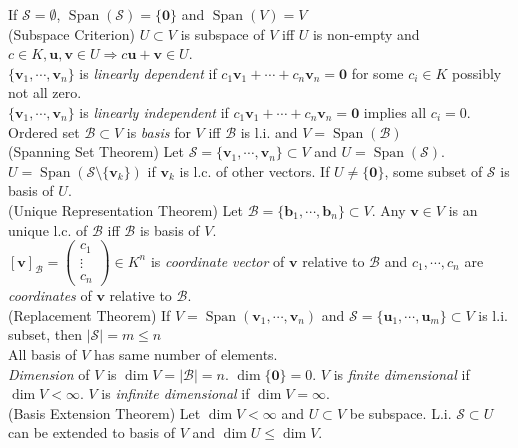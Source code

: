 \documentclass{article}
\theoremstyle{definition}
\DeclareMathOperator{\Span}{Span}
\begin{document}
If $\mathcal{S}=\emptyset$, $\Span(\mathcal{S})=\{\mathbf{0}\}$ and $\Span(V)=V$\\
(Subspace Criterion) $U\subset V$ is subspace of $V$ iff $U$ is non-empty and $c\in K,\mathbf{u},\mathbf{v}\in U\Rightarrow c\mathbf{u}+\mathbf{v}\in U$.\\
$\{\mathbf{v}_{1},\cdots,\mathbf{v}_{n}\}$ is \textit{linearly dependent} if $c_{1}\mathbf{v}_{1}+\cdots+c_{n}\mathbf{v}_{n}=\mathbf{0}$ for some $c_{i}\in K$ possibly not all zero.\\
$\{\mathbf{v}_{1},\cdots,\mathbf{v}_{n}\}$ is \textit{linearly independent} if $c_{1}\mathbf{v}_{1}+\cdots+c_{n}\mathbf{v}_{n}=\mathbf{0}$ implies all $c_{i}=0$.\\
Ordered set $\mathcal{B}\subset V$ is \textit{basis} for $V$ iff $\mathcal{B}$ is l.i. and $V=\Span(\mathcal{B})$\\
(Spanning Set Theorem) Let $\mathcal{S}=\{\mathbf{v}_{1},\cdots,\mathbf{v}_{n}\}\subset V$ and $U=\Span(\mathcal{S})$.\\
$U=\Span(\mathcal{S}\setminus\{\mathbf{v}_{k}\})$ if $\mathbf{v}_{k}$ is l.c. of other vectors. If $U\neq\{\mathbf{0}\}$, some subset of $\mathcal{S}$ is basis of $U$.\\
(Unique Representation Theorem) Let $\mathcal{B}=\{\mathbf{b}_{1},\cdots,\mathbf{b}_{n}\}\subset V$. Any $\mathbf{v}\in V$ is an unique l.c. of $\mathcal{B}$ iff $\mathcal{B}$ is basis of $V$.\\
$\left[\mathbf{v}\right]_{\mathcal{B}}=\begin{pmatrix}
    c_{1}\\
    \vdots\\
    c_{n}
\end{pmatrix}\in K^{n}$ is \textit{coordinate vector} of $\mathbf{v}$ relative to $\mathcal{B}$ and $c_{1},\cdots,c_{n}$ are \textit{coordinates} of $\mathbf{v}$ relative to $\mathcal{B}$.\\
(Replacement Theorem) If $V=\Span(\mathbf{v}_{1},\cdots,\mathbf{v}_{n})$ and $\mathcal{S}=\{\mathbf{u}_{1},\cdots,\mathbf{u}_{m}\}\subset V$ is l.i. subset, then $\left|\mathcal{S}\right|=m\leq n$\\
All basis of $V$ has same number of elements.\\
\textit{Dimension} of $V$ is $\dim{V}=\left|\mathcal{B}\right|=n$. $\dim\{\mathbf{0}\}=0$. $V$ is \textit{finite dimensional} if $\dim{V}<\infty$. $V$ is \textit{infinite dimensional} if $\dim{V}=\infty$.\\
(Basis Extension Theorem) Let $\dim{V}<\infty$ and $U\subset V$ be subspace. L.i. $\mathcal{S}\subset U$ can be extended to basis of $V$ and $\dim{U}\leq\dim{V}$.\\
\end{document}
